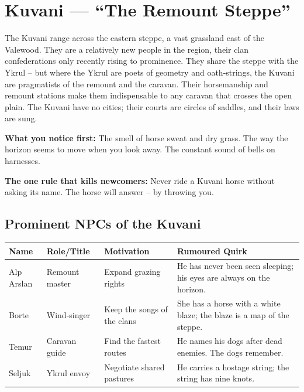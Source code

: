 \documentclass[11pt]{book}
\begin{document}

\section{Kuvani — ``The Remount Steppe''}
\label{sec:kuvani}

\begin{tcolorbox}[colback=black!3,colframe=blue!60!black,title={Theme \& Atmosphere}]
The Kuvani range across the eastern steppe, a vast grassland east of the Valewood. They are a relatively new people in the region, their clan confederations only recently rising to prominence. They share the steppe with the Ykrul – but where the Ykrul are poets of geometry and oath‑strings, the Kuvani are pragmatists of the remount and the caravan. Their horsemanship and remount stations make them indispensable to any caravan that crosses the open plain. The Kuvani have no cities; their courts are circles of saddles, and their laws are sung.

\vspace{2mm}
\textbf{What you notice first:} The smell of horse sweat and dry grass. The way the horizon seems to move when you look away. The constant sound of bells on harnesses.

\textbf{The one rule that kills newcomers:} Never ride a Kuvani horse without asking its name. The horse will answer – by throwing you.
\end{tcolorbox}

\subsection*{Prominent NPCs of the Kuvani}
\begin{longtable}{|p{}|p{}|p{}|p{}|}
\hline
\textbf{Name} & \textbf{Role/Title} & \textbf{Motivation} & \textbf{Rumoured Quirk} \\
\hline
Alp Arslan & Remount master & Expand grazing rights & He has never been seen sleeping; his eyes are always on the horizon. \\
\hline
Borte & Wind‑singer & Keep the songs of the clans & She has a horse with a white blaze; the blaze is a map of the steppe. \\
\hline
Temur & Caravan guide & Find the fastest routes & He names his dogs after dead enemies. The dogs remember. \\
\hline
Seljuk & Ykrul envoy & Negotiate shared pastures & He carries a hostage string; the string has nine knots. \\
\hline
\end{longtable}
\end{document}
